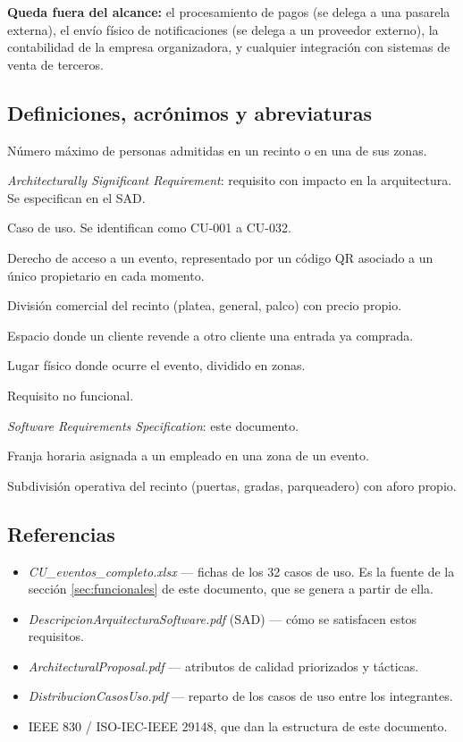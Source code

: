 \documentclass[11pt,a4paper]{article}
\begin{document}
\textbf{Queda fuera del alcance:} el procesamiento de pagos (se delega a una pasarela externa), el
envío físico de notificaciones (se delega a un proveedor externo), la contabilidad de la empresa
organizadora, y cualquier integración con sistemas de venta de terceros.

\subsection{Definiciones, acrónimos y abreviaturas}

\begin{description}[leftmargin=!, labelwidth=2.6cm, style=nextline, topsep=3pt]
  \item[Aforo] Número máximo de personas admitidas en un recinto o en una de sus zonas.
  \item[ASR] \textit{Architecturally Significant Requirement}: requisito con impacto en la
        arquitectura. Se especifican en el SAD.
  \item[CU] Caso de uso. Se identifican como CU-001 a CU-032.
  \item[Entrada] Derecho de acceso a un evento, representado por un código QR asociado a un único
        propietario en cada momento.
  \item[Localidad] División comercial del recinto (platea, general, palco) con precio propio.
  \item[Mercado secundario] Espacio donde un cliente revende a otro cliente una entrada ya
        comprada.
  \item[Recinto] Lugar físico donde ocurre el evento, dividido en zonas.
  \item[RNF] Requisito no funcional.
  \item[SRS] \textit{Software Requirements Specification}: este documento.
  \item[Turno] Franja horaria asignada a un empleado en una zona de un evento.
  \item[Zona] Subdivisión operativa del recinto (puertas, gradas, parqueadero) con aforo propio.
\end{description}

\subsection{Referencias}

\begin{itemize}
  \item \textit{CU\_eventos\_completo.xlsx} --- fichas de los 32 casos de uso. Es la fuente de la
        sección \ref{sec:funcionales} de este documento, que se genera a partir de ella.
  \item \textit{DescripcionArquitecturaSoftware.pdf} (SAD) --- cómo se satisfacen estos requisitos.
  \item \textit{ArchitecturalProposal.pdf} --- atributos de calidad priorizados y tácticas.
  \item \textit{DistribucionCasosUso.pdf} --- reparto de los casos de uso entre los integrantes.
  \item IEEE 830 / ISO-IEC-IEEE 29148, que dan la estructura de este documento.
\end{itemize}
\end{document}
